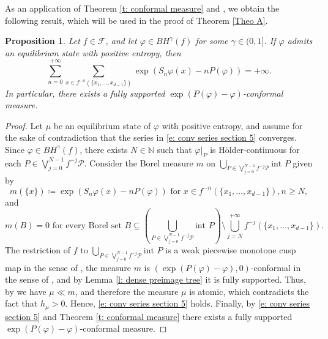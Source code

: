 \documentclass[10pt,a4paper]{amsart}
\numberwithin{equation}{section} %
\numberwithin{figure}{section} %
\newtheorem{prop}{Proposition}[section]
\newcommand{\N}{\mathbb{N}}
\renewcommand{\=}{\coloneqq}
\begin{document}
As an application of Theorem \ref{t: conformal measure} and \cite[Theorem 6]{Dobbs}, we obtain the following result, which will be used in the proof of Theorem \ref{Theo A}.
\begin{prop}\label{p: before proof thm C}
    Let $f \in \mathscr{F}$, and let $\varphi \in BH^\gamma(f)$ for some $\gamma \in (0,1]$. If $\varphi$ admits an equilibrium state with positive entropy, then 
      \begin{equation}\label{e: conv series section 5}
        \sum_{n=0}^{+\infty}\sum_{x\in f^{-n}(\{x_1,\dots,x_{d-1}\})}\exp(S_n\varphi(x)- nP(\varphi))=+\infty.
    \end{equation}
    In particular, there exists a fully supported $\exp(P(\varphi)-\varphi)$-conformal measure.
\end{prop}
\begin{proof}
    Let $\mu$ be an equilibrium state of $\varphi$ with positive entropy, and assume for the sake of contradiction that the series in \eqref{e: conv series section 5} converges. Since $\varphi \in BH^\gamma(f)$, there exists $N\in \N$ such that $\varphi|_P$ is Hölder-continuous for each $P\in \bigvee_{j=0}^{N-1}f^{-j}\mathcal{P}$. Consider the Borel measure $m$ on $\bigcup_{P\in \bigvee_{j=0}^{N-1}f^{-j}\mathcal{P}}\text{int }P$ given by
    \begin{equation}
      m(\{x\})\= \exp(S_n\varphi(x) - nP(\varphi)) \text{ for } x\in f^{-n}(\{x_1,\dots,x_{d-1}\}), n\geq N,
  \end{equation}
  and 
  \begin{equation*}
      m(B)=0 \text{ for every Borel set } B\subseteq \left( \bigcup_{P\in \bigvee_{j=0}^{N-1}f^{-j}\mathcal{P}}\text{int } P\right) \setminus \bigcup_{j=N}^{+\infty} f^{-j}(\{x_1,\dots,x_{d-1}\}).
  \end{equation*}
  The restriction of $f$ to $\bigcup_{P\in \bigvee_{j=0}^{N-1}f^{-j}\mathcal{P}}\text{int }P$ is a weak piecewise monotone cusp map in the sense of \cite[Definition 1]{Dobbs}, the measure $m$ is $(\exp(P(\varphi)-\varphi),0)$-conformal in the sense of \cite[Definition 2]{Dobbs}, and by Lemma \ref{l: dense preimage tree} it is fully supported. Thus, by \cite[Theorem 6]{Dobbs} we have $\mu\ll m$, and therefore the measure $\mu$ is atomic, which contradicts the fact that $h_{\mu}>0$. Hence, \eqref{e: conv series section 5} holds. Finally, by \eqref{e: conv series section 5} and Theorem \ref{t: conformal measure} there exists a fully supported $\exp(P(\varphi)- \varphi)$-conformal measure.
\end{proof}
\end{document}
